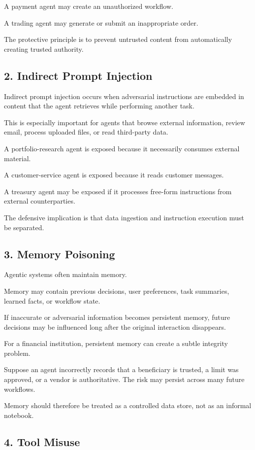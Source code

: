 A payment agent may create an unauthorized workflow.

A trading agent may generate or submit an inappropriate order.

The protective principle is to prevent untrusted content from automatically creating trusted authority.

\subsection{2. Indirect Prompt Injection}

Indirect prompt injection occurs when adversarial instructions are embedded in content that the agent retrieves while performing another task.

This is especially important for agents that browse external information, review email, process uploaded files, or read third-party data.

A portfolio-research agent is exposed because it necessarily consumes external material.

A customer-service agent is exposed because it reads customer messages.

A treasury agent may be exposed if it processes free-form instructions from external counterparties.

The defensive implication is that data ingestion and instruction execution must be separated.

\subsection{3. Memory Poisoning}

Agentic systems often maintain memory.

Memory may contain previous decisions, user preferences, task summaries, learned facts, or workflow state.

If inaccurate or adversarial information becomes persistent memory, future decisions may be influenced long after the original interaction disappears.

For a financial institution, persistent memory can create a subtle integrity problem.

Suppose an agent incorrectly records that a beneficiary is trusted, a limit was approved, or a vendor is authoritative. The risk may persist across many future workflows.

Memory should therefore be treated as a controlled data store, not as an informal notebook.

\subsection{4. Tool Misuse}

